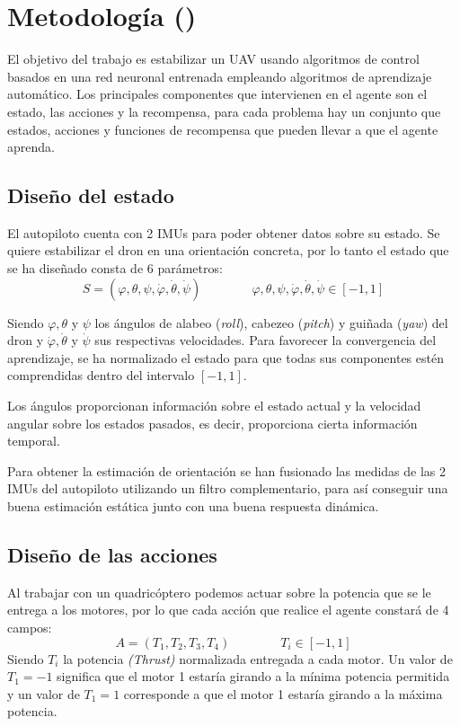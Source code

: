 \chapter{Metodología ()}

El objetivo del trabajo es estabilizar un UAV usando algoritmos de control basados en una red neuronal entrenada empleando algoritmos de aprendizaje automático. Los principales componentes que intervienen en el agente son el estado, las acciones y la recompensa, para cada problema hay un conjunto que estados, acciones y funciones de recompensa que pueden llevar a que el agente aprenda.

\section{Diseño del estado}
 El autopiloto cuenta con 2 IMUs para poder obtener datos sobre su estado. Se quiere estabilizar el dron en una orientación concreta, por lo tanto el estado que se ha diseñado consta de 6 parámetros:
\begin{equation}
	S=(\varphi,\theta,\psi,\dot\varphi,\dot\theta,\dot\psi) \qquad\qquad \varphi,\theta,\psi,\dot\varphi,\dot\theta,\dot\psi \in [-1,1]
\end{equation} 

Siendo $\varphi,\theta$ y $\psi$ los ángulos de alabeo (\textit{roll}), cabezeo (\textit{pitch}) y guiñada (\textit{yaw}) del dron  y $\dot\varphi,\dot\theta$ y $\dot\psi$ sus respectivas velocidades. Para favorecer la convergencia del aprendizaje, se ha normalizado el estado para que todas sus componentes estén comprendidas dentro del intervalo $[-1,1]$.

Los ángulos proporcionan información sobre el estado actual y la velocidad angular sobre los estados pasados, es decir, proporciona cierta información temporal. 

Para obtener la estimación de orientación se han fusionado las medidas de las 2 IMUs del autopiloto utilizando un filtro complementario, para así conseguir una buena estimación estática junto con una buena respuesta dinámica.
\section{Diseño de las acciones}
Al trabajar con un quadricóptero podemos actuar sobre la potencia que se le entrega a los motores, por lo que cada acción que realice el agente constará de 4 campos:
\begin{equation}
	A = (T_1,T_2,T_3,T_4) \qquad\qquad T_i \in [-1,1]
\end{equation}
Siendo $T_i$ la potencia \textit{(Thrust)} normalizada entregada a cada motor. Un valor de $T_1=-1$ significa que el motor 1 estaría girando a la mínima potencia permitida y un valor de $T_1=1$ corresponde a que el motor 1 estaría girando a la máxima potencia.\\


